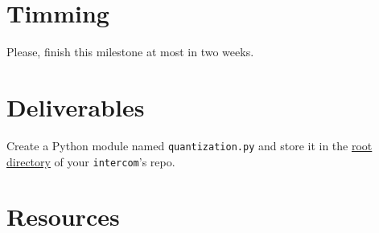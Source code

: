 \section{Timming}

Please, finish this milestone at most in two weeks.

\section{Deliverables}

Create a Python module named \texttt{quantization.py} and store it in
the \href{https://github.com/Tecnologias-multimedia/intercom}{root
  directory} of your \texttt{intercom}'s repo.

\section{Resources}


